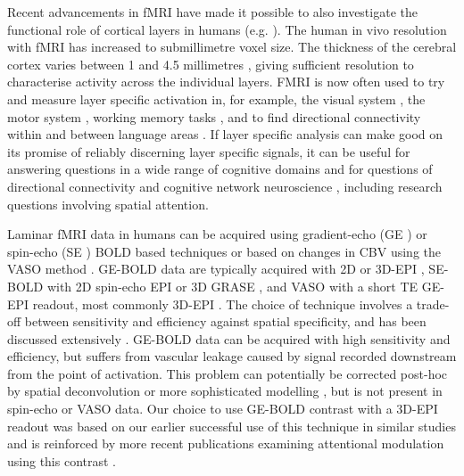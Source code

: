 \documentclass[9pt,lineno]{aperture}
\begin{document}
Recent advancements in fMRI have made it possible to also investigate the functional role of cortical layers in humans (e.g. \citet{Polimeni2010,Koopmans2010,Maass2014,Kok2016,Lawrence2018,Sharoh2019}). The human in vivo resolution with fMRI has increased to submillimetre voxel size. The thickness of the cerebral cortex varies between 1 and 4.5 millimetres \citep{Zilles1990,Fischl2000}, giving sufficient resolution to characterise activity across the individual layers. FMRI is now often used to try and measure layer specific activation in, for example, the visual system \citep{Muckli2015,Scheeringa2016,Kok2016,Lawrence2018,DeHollander2020}, the motor system \citep{Huber2018}, working memory tasks \citep{Finn2019}, and to find directional connectivity within and between language areas \citep{Sharoh2019}. If layer specific analysis can make good on its promise of reliably discerning layer specific signals, it can be useful for answering questions in a wide range of cognitive domains \citep{Lawrence2019} and for questions of directional connectivity and cognitive network neuroscience \citep{Huber2020}, including research questions involving spatial attention. 

Laminar fMRI data in humans can be acquired using gradient-echo (GE \citep{Koopmans2010, Polimeni2010}) or spin-echo (SE \citep{Olman2012}) BOLD based techniques or based on changes in CBV using the VASO method \citep{Huber2018}. GE-BOLD data are typically acquired with 2D or 3D-EPI \citep{Poser2010}, SE-BOLD with 2D spin-echo EPI or 3D GRASE \citep{Kemper2015}, and VASO with a short TE GE-EPI readout, most commonly 3D-EPI \citep{Huber2018,Poser2010}. The choice of technique involves a trade-off between sensitivity and efficiency against spatial specificity, and has been discussed extensively \citep{Yang2021,Norris2019}. GE-BOLD data can be acquired with high sensitivity and efficiency, but suffers from vascular leakage caused by signal recorded downstream from the point of activation. This problem can potentially be corrected post-hoc by spatial deconvolution \citep{Markuerkiaga2021} or more sophisticated modelling \citep{Havlicek2020}, but is not present in spin-echo or VASO data. Our choice to use GE-BOLD contrast with a 3D-EPI readout was based on our earlier successful use of this technique in similar studies \citep{Kok2016, Lawrence2018} and is reinforced by more recent publications examining attentional modulation using this contrast \citep{Liu2020,Gau2020,DeHollander2020,Klein2018,Marquardt2020}.
\end{document}
